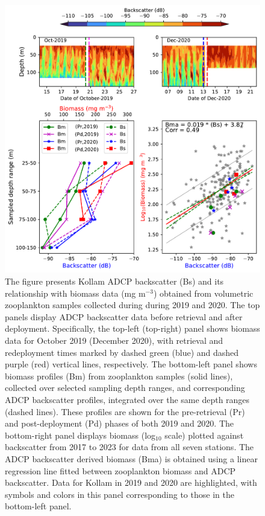 \documentclass[12pt,a4paper]{article}
\begin{document}
\begin{figure}[htbp]
	\centering
	\includegraphics[width=\textwidth]{./fig_s10_Kollam_2020_verification.pdf} 
	\caption{The figure presents Kollam ADCP backscatter (Bs) and its relationship with biomass data (mg m$^{-3}$) obtained from volumetric zooplankton samples collected during during 2019 and 2020. The top panels display ADCP backscatter data before retrieval and after deployment. Specifically, the top-left (top-right) panel shows biomass data for October 2019 (December 2020), with retrieval and redeployment times marked by dashed green (blue) and dashed purple (red) vertical lines, respectively. The bottom-left panel shows biomass profiles (Bm) from zooplankton samples (solid lines), collected over selected sampling depth ranges, and corresponding ADCP backscatter profiles, integrated over the same depth ranges (dashed lines). These profiles are shown for the pre-retrieval (Pr) and post-deployment (Pd) phases of both 2019 and 2020. The bottom-right panel displays biomass (log$_{10}$ scale) plotted against backscatter from 2017 to 2023 for data from all seven stations. The ADCP backscatter derived biomass (Bma) is obtained using a linear regression line fitted between zooplankton biomass and ADCP backscatter. Data for Kollam in 2019 and 2020 are highlighted, with symbols and colors in this panel corresponding to those in the bottom-left panel.}
	\label{fig:kollam_verification_2020}
\end{figure}
\end{document}
